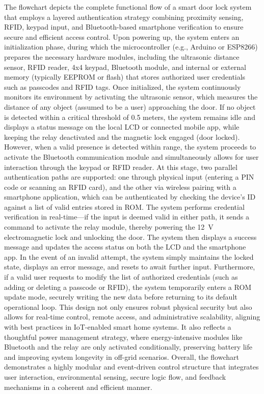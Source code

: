 \documentclass[conference, onecolumn]{IEEEtran}
\begin{document}
The flowchart depicts the complete functional flow of a smart door lock system that employs a layered authentication strategy combining proximity sensing, RFID, keypad input, and Bluetooth-based smartphone verification to ensure secure and efficient access control. Upon powering up, the system enters an initialization phase, during which the microcontroller (e.g., Arduino or ESP8266) prepares the necessary hardware modules, including the ultrasonic distance sensor, RFID reader, 4x4 keypad, Bluetooth module, and internal or external memory (typically EEPROM or flash) that stores authorized user credentials such as passcodes and RFID tags. Once initialized, the system continuously monitors its environment by activating the ultrasonic sensor, which measures the distance of any object (assumed to be a user) approaching the door. If no object is detected within a critical threshold of 0.5 meters, the system remains idle and displays a status message on the local LCD or connected mobile app, while keeping the relay deactivated and the magnetic lock engaged (door locked). However, when a valid presence is detected within range, the system proceeds to activate the Bluetooth communication module and simultaneously allows for user interaction through the keypad or RFID reader. At this stage, two parallel authentication paths are supported: one through physical input (entering a PIN code or scanning an RFID card), and the other via wireless pairing with a smartphone application, which can be authenticated by checking the device’s ID against a list of valid entries stored in ROM. The system performs credential verification in real-time—if the input is deemed valid in either path, it sends a command to activate the relay module, thereby powering the 12~V electromagnetic lock and unlocking the door. The system then displays a success message and updates the access status on both the LCD and the smartphone app. In the event of an invalid attempt, the system simply maintains the locked state, displays an error message, and resets to await further input. Furthermore, if a valid user requests to modify the list of authorized credentials (such as adding or deleting a passcode or RFID), the system temporarily enters a ROM update mode, securely writing the new data before returning to its default operational loop. This design not only ensures robust physical security but also allows for real-time control, remote access, and administrative scalability, aligning with best practices in IoT-enabled smart home systems. It also reflects a thoughtful power management strategy, where energy-intensive modules like Bluetooth and the relay are only activated conditionally, preserving battery life and improving system longevity in off-grid scenarios. Overall, the flowchart demonstrates a highly modular and event-driven control structure that integrates user interaction, environmental sensing, secure logic flow, and feedback mechanisms in a coherent and efficient manner.
\end{document}
